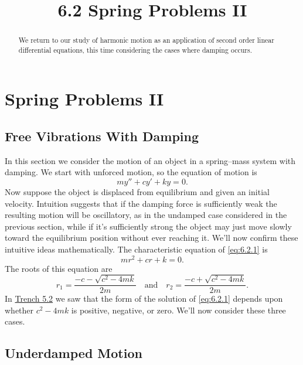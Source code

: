 \documentclass{ximera}
\title{6.2 Spring Problems II}
\begin{document}
 
\begin{abstract}
 We return to our study of harmonic motion as an application of second order linear differential equations, this time considering the cases where damping occurs.
\end{abstract}
 
\maketitle
 
\section*{Spring Problems II}
 
\subsection*{Free Vibrations With Damping}
 
In this section we consider the motion of an object in a spring--mass
system with damping. We start with unforced motion, so the equation of
motion is
\begin{equation}\label{eq:6.2.1}
my''+cy'+ky=0.
\end{equation}
Now suppose   the object is displaced from equilibrium and given an
initial velocity. Intuition suggests that if the damping force is
sufficiently weak the resulting motion will be oscillatory, as in the
undamped case considered in the previous section, while if it's
sufficiently strong the object may just move slowly toward the
equilibrium
position without ever reaching it. We'll now confirm these intuitive
ideas mathematically. The characteristic equation of \eqref{eq:6.2.1} is
$$
mr^2+cr+k=0.
$$
The roots of this equation are
\begin{equation}\label{eq:6.2.2}
r_1=\frac{-c-\sqrt{c^2-4mk}}{2m}\quad\mbox{and}\quad r_2=
\frac{-c+\sqrt{c^2-4mk}}{2m}.
\end{equation}
In \href{https://ximera.osu.edu/ode/main/constantCoefficientHomogeneousEquations/constantCoefficientHomogeneousEquations}{Trench 5.2} we saw that the form of the
solution of  \eqref{eq:6.2.1} depends upon whether $c^2-4mk$ is positive,
negative, or zero. We'll now consider these three cases.
 
\subsection*{Underdamped Motion}
 
\end{document}
